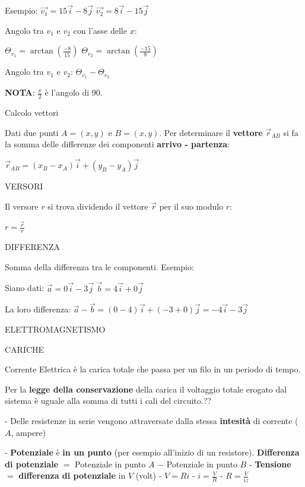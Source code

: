 \documentclass{article}
\begin{document}
Esempio:
$\overrightarrow{v_1} = 15\overrightarrow{i} - 8\overrightarrow{j}$
$\overrightarrow{v_2} = 8\overrightarrow{i} - 15\overrightarrow{j}$


Angolo tra $v_1$ e $v_2$ con l'asse delle $x$:

$\Theta_{v_1}=\arctan(\frac{-8}{15})$
$\Theta_{v_2}=\arctan(\frac{-15}{8})$

Angolo tra $v_1$ e $v_2$: $\Theta_{v_1}-\Theta_{v_2}$

\textbf{NOTA}: $\frac{\pi}{2}$ è l'angolo di 90.

Calcolo vettori

Dati due punti $A=(x,y)$ e $B=(x,y)$. Per determinare il \textbf{vettore} $\overrightarrow{r}_{AB}$ si fa la somma delle differenze dei componenti \textbf{arrivo - partenza}:

$\overrightarrow{r}_{AB} = (x_B-x_A)\overrightarrow{i} + (y_B-y_A)\overrightarrow{j}$


VERSORI

Il versore $r$ si trova dividendo il vettore $\overrightarrow{r}$ per il suo modulo $r$:

$r=\frac{\overrightarrow{r}}{r}$


DIFFERENZA

Somma della differenza tra le componenti. Esempio:

Siano dati:
$\overrightarrow{a} = 0\overrightarrow{i}-3\overrightarrow{j}$
$\overrightarrow{b} = 4\overrightarrow{i}+0\overrightarrow{j}$

La loro differenza:
$\overrightarrow{a}-\overrightarrow{b} = (0-4)\overrightarrow{i}+(-3+0)\overrightarrow{j} = -4\overrightarrow{i}-3\overrightarrow{j}$


\pagebreak

ELETTROMAGNETISMO

CARICHE

Corrente Elettrica è la carica totale che passa per un filo in un periodo di tempo.

Per la \textbf{legge della conservazione} della carica il voltaggio totale erogato dal sistema è uguale alla somma di tutti i cali del circuito.??

- Delle resistenze in serie vengono attraversate dalla stessa \textbf{intesità} di corrente ($A$, ampere)

- \textbf{Potenziale} è \textbf{in un punto} (per esempio all'inizio di un resistore).
  \textbf{Differenza di potenziale} $=$ Potenziale in punto $A$ $-$ Potenziale in punto $B$
- \textbf{Tensione} $=$ \textbf{differenza di potenziale} in $V$ (volt)
  - $V=Ri$
  - $i=\frac{V}{R}$
  - $R=\frac{V}{iz}$
\end{document}
